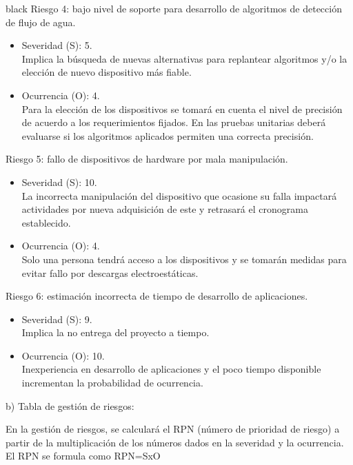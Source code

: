 \documentclass[
11pt, %
codirector, %
]{charter}
\begin{document}
\begin{consigna}{black}
Riesgo 4: bajo nivel de soporte para desarrollo de algoritmos de detección de flujo de agua.
\begin{itemize}
	\item Severidad (S): 5. \\
	Implica la búsqueda de nuevas alternativas para replantear algoritmos y/o la elección de nuevo dispositivo más fiable.
	\item Ocurrencia (O): 4. \\
	Para la elección de los dispositivos se tomará en cuenta el nivel de precisión de acuerdo a los requerimientos fijados. En las pruebas unitarias deberá evaluarse si los algoritmos aplicados permiten una correcta precisión.
\end{itemize}

Riesgo 5: fallo de dispositivos de hardware por mala manipulación.
\begin{itemize}
	\item Severidad (S): 10. \\
	La incorrecta manipulación del dispositivo que ocasione su falla impactará actividades por nueva adquisición de este y retrasará el cronograma establecido.
	\item Ocurrencia (O): 4. \\
	Solo una persona tendrá acceso a los dispositivos y se tomarán medidas para evitar fallo por descargas electroestáticas.
\end{itemize}

Riesgo 6: estimación incorrecta de tiempo de desarrollo de aplicaciones.
\begin{itemize}
	\item Severidad (S): 9. \\
	Implica la no entrega del proyecto a tiempo.
	\item Ocurrencia (O): 10. \\
	Inexperiencia en desarrollo de aplicaciones y el poco tiempo disponible incrementan la probabilidad de ocurrencia.
\end{itemize}



b) Tabla de gestión de riesgos:      

En la gestión de riesgos, se calculará el RPN (número de prioridad de riesgo) a partir de la multiplicación de los números dados en la severidad y la ocurrencia. El RPN se formula como RPN=SxO


\end{consigna}
\end{document}
